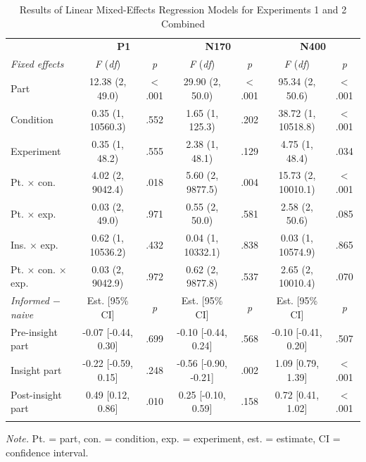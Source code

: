 \documentclass[
  english,
  doc,12pt,twoside,floatsintext]{apa7}
\begin{document}
\begin{table}[tbp]

\begin{center}
\begin{threeparttable}

\caption{\label{tab:joint-table}Results of Linear Mixed-Effects Regression Models for Experiments 1 and 2 Combined\smallskip}

\footnotesize{

\begin{tabular}{lcccccc}
\toprule
 & \multicolumn{2}{c}{\textbf{P1}} & \multicolumn{2}{c}{\textbf{N170}} & \multicolumn{2}{c}{\textbf{N400}} \\
\cmidrule(r){2-3} \cmidrule(r){4-5} \cmidrule(r){6-7}
\textit{Fixed effects} & \textit{F} (\textit{df}) & \textit{p} & \textit{F} (\textit{df}) & \textit{p} & \textit{F} (\textit{df}) & \textit{p}\\
\midrule
Part & 12.38 (2, 49.0) & < .001 & 29.90 (2, 50.0) & < .001 & 95.34 (2, 50.6) & < .001\\
Condition & 0.35 (1, 10560.3) & .552 & 1.65 (1, 125.3) & .202 & 38.72 (1, 10518.8) & < .001\\
Experiment & 0.35 (1, 48.2) & .555 & 2.38 (1, 48.1) & .129 & 4.75 (1, 48.4) & .034\\
Pt. × con. & 4.02 (2, 9042.4) & .018 & 5.60 (2, 9877.5) & .004 & 15.73 (2, 10010.1) & < .001\\
Pt. × exp. & 0.03 (2, 49.0) & .971 & 0.55 (2, 50.0) & .581 & 2.58 (2, 50.6) & .085\\
Ins. × exp. & 0.62 (1, 10536.2) & .432 & 0.04 (1, 10332.1) & .838 & 0.03 (1, 10574.9) & .865\\
Pt. × con. × exp. & 0.03 (2, 9042.9) & .972 & 0.62 (2, 9877.8) & .537 & 2.65 (2, 10010.4) & .070\\
\textit{Informed $-$  naive} & Est. [95\% CI] & \textit{p} & Est. [95\% CI] & \textit{p} & Est. [95\% CI] & \textit{p}\\ \midrule
Pre-insight part & -0.07 [-0.44, 0.30] & .699 & -0.10 [-0.44, 0.24] & .568 & -0.10 [-0.41, 0.20] & .507\\
Insight part & -0.22 [-0.59, 0.15] & .248 & -0.56 [-0.90, -0.21] & .002 & 1.09 [0.79, 1.39] & < .001\\
Post-insight part & 0.49 [0.12, 0.86] & .010 & 0.25 [-0.10, 0.59] & .158 & 0.72 [0.41, 1.02] & < .001\\
\bottomrule
\addlinespace
\end{tabular}

}

\begin{tablenotes}[para]
\normalsize{\textit{Note.} Pt. = part, con. = condition, exp. = experiment, est. = estimate, CI = confidence interval.}
\end{tablenotes}

\end{threeparttable}
\end{center}

\end{table}
\end{document}
